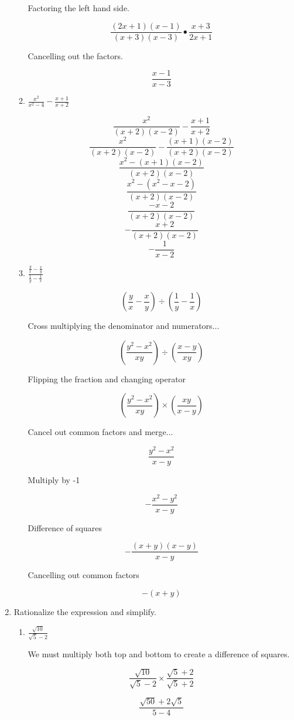 \documentclass{article}
\begin{document}
\begin{enumerate}
\begin{enumerate}
			Factoring the left hand side.
			
			$$\frac{(2x + 1)(x - 1)}{(x + 3)(x - 3)} \bullet \frac{x+3}{2x+1}$$
			
			Cancelling out the factors.
			
			$$\frac{x-1}{x-3}$$
			
		\item $\frac{x^2}{x^2 - 4} - \frac{x+1}{x+2}$
		
			$$\frac{x^2}{(x + 2)(x - 2)} - \frac{x+1}{x+2}$$
			$$\frac{x^2}{(x+2)(x-2)} - \frac{(x+1)(x-2)}{(x+2)(x-2)}$$
			$$\frac{x^2 - (x+1)(x-2)}{(x+2)(x-2)}$$
			$$\frac{x^2 - (x^2 - x - 2)}{(x+2)(x-2)}$$
			$$\frac{-x-2}{(x+2)(x-2)}$$
			$$-\frac{x+2}{(x+2)(x-2)}$$
			$$-\frac{1}{x-2}$$
			
		\item $\frac{\frac{y}{x} - \frac{x}{y}}{\frac{1}{y} - \frac{1}{x}}$

			$$(\frac{y}{x} - \frac{x}{y}) \div (\frac{1}{y} - \frac{1}{x})$$

			Cross multiplying the denominator and numerators...

			$$(\frac{y^2 - x^2}{xy}) \div (\frac{x-y}{xy})$$

			Flipping the fraction and changing operator

			$$(\frac{y^2 - x^2}{xy}) \times (\frac{xy}{x-y})$$

			Cancel out common factors and merge...

			$$\frac{y^2 - x^2}{x-y}$$

			Multiply by -1

			$$-\frac{x^2 - y^2}{x-y}$$

			Difference of squares

			$$-\frac{(x+y)(x-y)}{x-y}$$

			Cancelling out common factors

			$$-(x+y)$$
		
	\end{enumerate}
	\item Rationalize the expression and simplify.
	\begin{enumerate}
		\item $\frac{\sqrt{10}}{\sqrt{5} - 2}$

			We must multiply both top and bottom to create a difference of squares.

			$$\frac{\sqrt{10}}{\sqrt{5} - 2} \times \frac{\sqrt{5}+2}{\sqrt{5}+2}$$

			$$\frac{\sqrt{50} + 2\sqrt{5}}{5 - 4}$$


\end{enumerate}
\end{enumerate}
\end{document}
